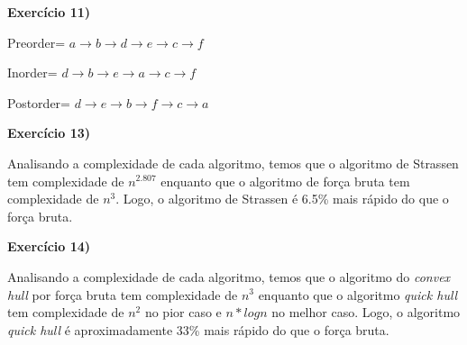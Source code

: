 \documentclass[12pt,a4paper]{article}
\begin{document}
\hrulefill

\textbf{Exercício 11)}

Preorder= $a\rightarrow b\rightarrow d\rightarrow e\rightarrow c\rightarrow f$

Inorder= $d\rightarrow b\rightarrow e\rightarrow a\rightarrow c\rightarrow f$

Postorder= $d\rightarrow e\rightarrow b\rightarrow f\rightarrow c\rightarrow a$

\hrulefill

\textbf{Exercício 13)}

Analisando a complexidade de cada algoritmo, temos que o algoritmo de Strassen tem complexidade de $n^{2.807}$ enquanto que o algoritmo de força bruta tem complexidade de $n^3$. Logo, o algoritmo de Strassen é 6.5\% mais rápido do que o força bruta.

\hrulefill

\textbf{Exercício 14)}

Analisando a complexidade de cada algoritmo, temos que o algoritmo do \emph{convex hull} por força bruta tem complexidade de $n^3$ enquanto que o algoritmo \emph{quick hull} tem complexidade de $n^2$ no pior caso e $n*log n$ no melhor caso. Logo, o algoritmo \emph{quick hull} é aproximadamente 33\% mais rápido do que o força bruta.
\end{document}
